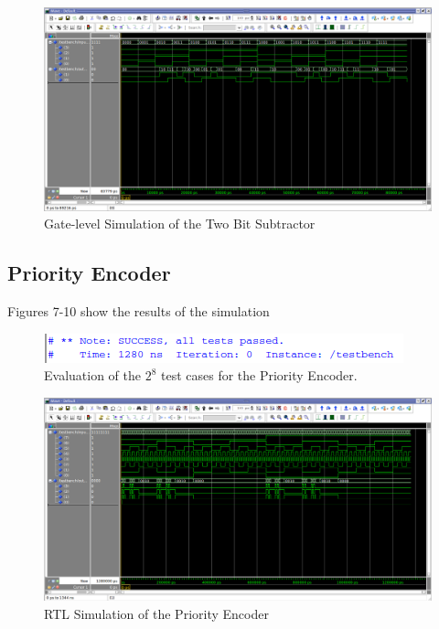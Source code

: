 \documentclass[a4paper, 11pt]{article}
\begin{document}
\begin{figure}[H]
\centering
\includegraphics[scale=0.33]{Subtractor_Gate}
\caption{Gate-level Simulation of the Two Bit Subtractor}
\end{figure}

\subsection{Priority Encoder}
Figures 7-10 show the results of the simulation

\begin{figure}[H]
\centering
\includegraphics[scale=1]{PE_Success}
\caption{Evaluation of the $2^8$ test cases for the Priority Encoder.}
\end{figure}

\begin{figure}[H]
\centering
\includegraphics[scale=0.33]{PE_RTL}
\caption{RTL Simulation of the Priority Encoder}
\end{figure}
\end{document}
